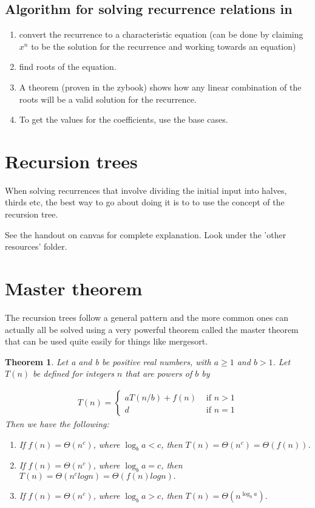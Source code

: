 \documentclass[12pt]{article}
\newtheorem{theorem}{Theorem}
\begin{document}
\subsection*{Algorithm for solving recurrence relations in}

\begin{enumerate}
\item convert the recurrence to a characteristic equation (can be done by claiming $x^n$ to be the solution for the recurrence and working towards an equation)
\item find roots of the equation.
\item A theorem (proven in the zybook) shows how any linear combination of the roots will be a valid solution for the recurrence.
\item To get the values for the coefficients, use the base cases.
\end{enumerate}

\section*{Recursion trees}

When solving recurrences that involve dividing the initial input into halves, thirds etc, the best way to go about doing it is to to use the concept of the recursion tree.

See the handout on canvas for complete explanation. Look under the 'other resources' folder.

\section*{Master theorem}
The recursion trees follow a general pattern and the more common ones can actually all be solved using a very powerful theorem called the master theorem that can be used quite easily for things like mergesort.

\begin{theorem}

Let a and b be positive real numbers, with $a \ge 1$
and $b > 1$. Let $T(n)$ be defined for integers $n$ that are powers of $b$ by

\begin{align*}
T(n) = \begin{cases}
aT(n/b) + f(n) &\mbox{ if } n > 1 \\
d &\mbox{ if } n = 1
\end{cases}
\end{align*}
Then we have the following:

\begin{enumerate}
\item If $f(n) = \Theta(n^c )$, where $\log_b a < c$, then
$T(n) = \Theta(n^c ) = \Theta (f(n))$.
\item If $f(n) = \Theta(n^c )$, where $\log_b a = c$, then
$T(n) = \Theta(n^c logn) = \Theta (f(n)logn ).$
\item  If $f(n) = \Theta(n^c )$, where $\log_b a > c$, then $T(n) = \Theta(n ^ {\log_b a} )$.

\end{enumerate}


\end{theorem}
\end{document}
